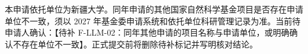 \justifying
\NSFCBodyText

本申请依托单位为新疆大学。同年申请的其他国家自然科学基金项目是否存在申请单位不一致，须以 2027 年基金委申请系统和依托单位科研管理记录为准。当前待申请人确认：【待补 F-LLM-02：同年其他申请的项目名称与申请单位，或明确确认不存在单位不一致】。正式提交前将删除待补标记并写明核对结论。
